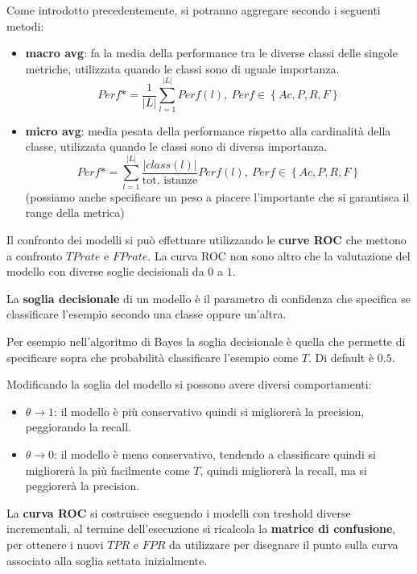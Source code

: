 Come introdotto precedentemente, si potranno aggregare secondo i seguenti metodi:
\begin{itemize}
    \item \textbf{macro avg}: fa la media della performance tra le diverse classi
          delle singole metriche, utilizzata quando le classi sono di uguale importanza.
          \begin{equation}
              Perf\ast = \frac{1}{|L|}\sum\limits_{l=1}^{|L|} Perf(l), \ Perf \in
              \left\{Ac, P, R, F\right\}
          \end{equation}
    \item \textbf{micro avg}: media pesata della performance rispetto alla cardinalità
          della classe, utilizzata quando le classi sono di diversa importanza.
          \begin{equation}
              Perf\ast = \sum\limits_{l=1}^{|L|} \frac{|class(l)|}{\text{tot.
                      istanze}}Perf(l), \ Perf \in \left\{Ac, P, R, F\right\}
          \end{equation}
          (possiamo anche specificare un peso a piacere l'importante che si
          garantisca il range della metrica)
\end{itemize}
Il confronto dei modelli si può effettuare utilizzando le \textbf{curve ROC} che
mettono a confronto $TP rate$ e $FP rate$. La curva ROC non sono altro che la
valutazione del modello con diverse soglie decisionali da $0$ a $1$.
\begin{definizione}
    La \textbf{soglia decisionale} di un modello è il parametro di confidenza
    che specifica se classificare l'esempio secondo una classe oppure un'altra.
\end{definizione}
\begin{esempio}
    Per esempio nell'algoritmo di Bayes la soglia decisionale è quella che permette
    di specificare sopra che probabilità classificare l'esempio come $T$. Di default
    è $0.5$.
\end{esempio}
Modificando la soglia del modello si possono avere diversi comportamenti:
\begin{itemize}
    \item $\theta \to 1$: il modello è più conservativo quindi si migliorerà la
          precision, peggiorando la recall.
    \item $\theta \to 0$: il modello è meno conservativo, tendendo a classificare
          quindi si migliorerà la più facilmente come $T$, quindi migliorerà la
          recall, ma si peggiorerà la precision.
\end{itemize}
La \textbf{curva ROC} si costruisce eseguendo i modelli con treshold diverse
incrementali, al termine dell'esecuzione si ricalcola la \textbf{matrice di
    confusione}, per ottenere i nuovi $TPR$ e $FPR$ da utilizzare per disegnare
il punto sulla curva associato alla soglia settata inizialmente.

